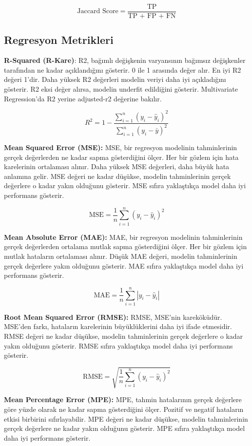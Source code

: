 \[\text{Jaccard Score} = \frac{\text{TP}}{\text{TP + FP + FN}}\]

\subsection{Regresyon Metrikleri}

\textbf{R-Squared (R-Kare)}: R2, bağımlı değişkenin varyansının bağımsız değişkenler tarafından ne kadar açıklandığını gösterir. 0 ile 1 arasında değer alır. En iyi R2 değeri 1'dir. Daha yüksek R2 değerleri modelin veriyi daha iyi açıkladığını gösterir. R2 eksi değer alırsa, modelin underfit edildiğini gösterir. Multivariate Regression'da R2 yerine adjusted-r2 değerine bakılır.

\[R^2 = 1 - \frac{\sum_{i=1}^{n} (y_i - \hat{y}_i)^2}{\sum_{i=1}^{n} (y_i - \bar{y})^2}\]

\textbf{Mean Squared Error (MSE):} MSE, bir regresyon modelinin tahminlerinin gerçek değerlerden ne kadar sapma gösterdiğini ölçer. Her bir gözlem için hata karelerinin ortalaması alınır. Daha yüksek MSE değerleri, daha büyük hata anlamına gelir. MSE değeri ne kadar düşükse, modelin tahminlerinin gerçek değerlere o kadar yakın olduğunu gösterir. MSE sıfıra yaklaştıkça model daha iyi performans gösterir.

\[\text{MSE} = \frac{1}{n} \sum_{i=1}^{n} (y_i - \hat{y}_i)^2\]

\textbf{Mean Absolute Error (MAE):} MAE, bir regresyon modelinin tahminlerinin gerçek değerlerden ortalama mutlak sapma gösterdiğini ölçer. Her bir gözlem için mutlak hataların ortalaması alınır. Düşük MAE değeri, modelin tahminlerinin gerçek değerlere yakın olduğunu gösterir. MAE sıfıra yaklaştıkça model daha iyi performans gösterir.

\[\text{MAE} = \frac{1}{n} \sum_{i=1}^{n} |y_i - \hat{y}_i|\]

\textbf{Root Mean Squared Error (RMSE):} RMSE, MSE'nin kareköküdür. MSE'den farkı, hataların karelerinin büyüklüklerini daha iyi ifade etmesidir. RMSE değeri ne kadar düşükse, modelin tahminlerinin gerçek değerlere o kadar yakın olduğunu gösterir. RMSE sıfıra yaklaştıkça model daha iyi performans gösterir.

\[\text{RMSE} = \sqrt{\frac{1}{n} \sum_{i=1}^{n} (y_i - \hat{y}_i)^2}\]

\textbf{Mean Percentage Error (MPE):} MPE, tahmin hatalarının gerçek değerlere göre yüzde olarak ne kadar sapma gösterdiğini ölçer. Pozitif ve negatif hataların etkisi birbirini sıfırlayabilir. MPE değeri ne kadar düşükse, modelin tahminlerinin gerçek değerlere ne kadar yakın olduğunu gösterir. MPE sıfıra yaklaştıkça model daha iyi performans gösterir.

